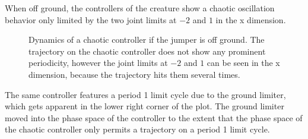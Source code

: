 \documentclass[main]{subfiles}
\begin{document}
When off ground, the controllers of the creature show a chaotic oscillation behavior only limited by the two joint limits at \(-2\) and \(1\) in the x dimension. %

\begin{figure}[H]
\centering
	\begin{minipage}{1.3\textwidth}
	\hspace*{-5em}
	\end{minipage}
\caption[Off ground controller dynamics of the crawler]{Dynamics of a chaotic controller if the jumper is off ground. The trajectory on the chaotic controller does not show any prominent periodicity, however the joint limits at \(-2\) and \(1\) can be seen in the x dimension, because the trajectory hits them several times.}
\label{figure:crawler1-off-ground-controller-dynamics}
\end{figure}

The same controller features a period 1 limit cycle due to the ground limiter, which gets apparent in the lower right corner of the plot. %
%
The ground limiter moved into the phase space of the controller to the extent that the phase space of the chaotic controller only permits a trajectory on a period 1 limit cycle.%
\end{document}
